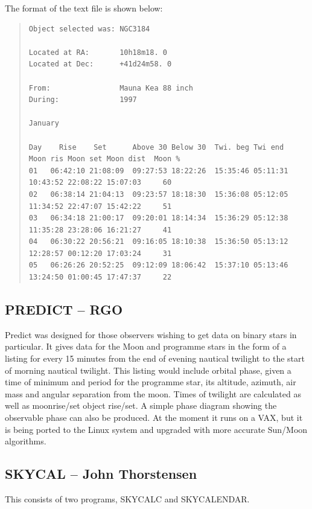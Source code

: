 \documentclass[twoside,11pt]{article}
\newcommand{\xlabel}[1]{}
\begin{document}
The format of the text file is shown below:
{\scriptsize
\begin{quote}
\begin{verbatim}
Object selected was: NGC3184

Located at RA:       10h18m18. 0
Located at Dec:      +41d24m58. 0

From:                Mauna Kea 88 inch
During:              1997

January

Day    Rise    Set      Above 30 Below 30  Twi. beg Twi end   Moon ris Moon set Moon dist  Moon %
01   06:42:10 21:08:09  09:27:53 18:22:26  15:35:46 05:11:31  10:43:52 22:08:22 15:07:03     60
02   06:38:14 21:04:13  09:23:57 18:18:30  15:36:08 05:12:05  11:34:52 22:47:07 15:42:22     51
03   06:34:18 21:00:17  09:20:01 18:14:34  15:36:29 05:12:38  11:35:28 23:28:06 16:21:27     41
04   06:30:22 20:56:21  09:16:05 18:10:38  15:36:50 05:13:12  12:28:57 00:12:20 17:03:24     31
05   06:26:26 20:52:25  09:12:09 18:06:42  15:37:10 05:13:46  13:24:50 01:00:45 17:47:37     22
\end{verbatim}
\end{quote}
}

\subsection{PREDICT -- RGO} \xlabel{PREDICT}
\label{sec:predict}

Predict was designed for those observers wishing to get data on binary stars
in particular. It gives data for the Moon and programme stars in the form of
a listing for every 15 minutes from the end of evening nautical twilight to
the start of morning nautical twilight. This listing would include orbital
phase, given a time of minimum and period for the programme star, its
altitude, azimuth, air mass and angular separation from the moon. Times of
twilight are calculated as well as moonrise/set object rise/set. A simple
phase diagram showing the observable phase can also be produced.  At the
moment it runs on a VAX, but it is being ported to the Linux system and upgraded
with more accurate Sun/Moon algorithms.


\subsection{SKYCAL -- John Thorstensen} \xlabel{SKYCAL}
\label{sec:skycal}

This consists of two programs, SKYCALC and SKYCALENDAR.
\end{document}
